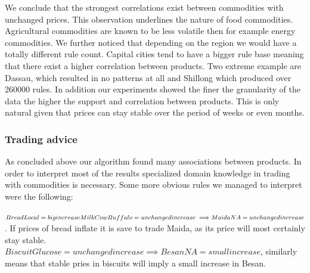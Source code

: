 We conclude that the strongest correlations exist between commodities with unchanged prices. This observation underlines the nature of food commodities. Agricultural commodities are known to be less volatile then for example energy commodities. We further noticed that depending on the region we would have a totally different rule count. Capital cities tend to have a bigger rule base meaning that there exist a higher correlation between products. Two extreme example are Dassau, which resulted in no patterns at all and Shillong which produced over 260000 rules. In addition our experiments showed the finer the granularity of the data the higher the support and correlation between products. This is only natural given that prices can stay stable over the period of weeks or even months. 

\subsubsection{Trading advice }

As concluded above our algorithm found many associations between products. In order to interpret most of the results specialized domain knowledge in trading with commodities is  necessary. Some more obvious rules we managed to interpret were the following:

$BreadLocal=big increase MilkCowBuffalo=unchanged increase \implies \\MaidaNA=unchanged increase$. If prices of bread inflate it is save to trade Maida, as its price will most certainly stay stable. \\$BiscuitGlucose=unchanged increase \implies BesanNA=small increase$, similarly means that stable pries in biscuits will imply a small increase in Besan. 

